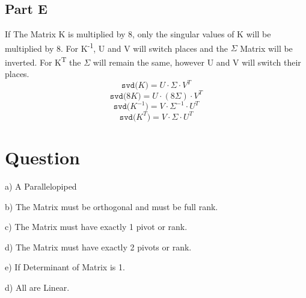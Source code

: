 \documentclass[12pt,a4paper]{article}
\begin{document}
\subsection{Part E}
If The Matrix K is multiplied by 8, only the singular values of K will be multiplied by 8. 
For K\textsuperscript{-1}, U and V will switch places and the $\Sigma$ Matrix will be inverted.
For K\textsuperscript{T} the $\Sigma$ will remain the same, however  U and V will switch their places.
$$\texttt{svd(}K\texttt{)} = U\cdot \Sigma\cdot V^T$$
$$\texttt{svd(}8K\texttt{)} = U\cdot (8\Sigma)\cdot V^T$$
$$\texttt{svd(}K^{-1}\texttt{)} = V\cdot \Sigma^{-1}\cdot U^T$$
$$\texttt{svd(}K^{T}\texttt{)} =  V\cdot \Sigma\cdot U^T$$



\section{Question}

\noindent a) A Parallelopiped

\noindent b) The Matrix must be orthogonal and must be full rank.

\noindent c) The Matrix must have exactly 1 pivot or rank.

\noindent d) The Matrix must have exactly 2 pivots or rank.

\noindent e) If Determinant of Matrix is 1.

\noindent d) All are Linear.
\end{document}
